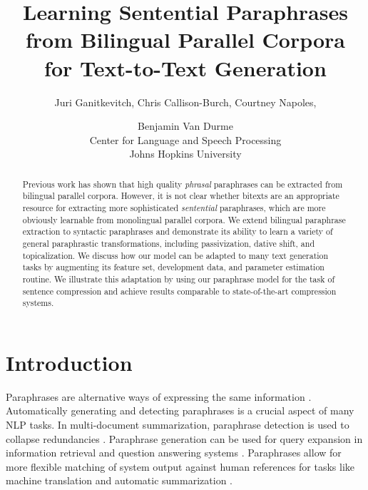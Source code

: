 \documentclass[11pt]{article}
\title{Learning Sentential Paraphrases from Bilingual Parallel Corpora
  \\ for Text-to-Text Generation}
\author{Juri Ganitkevitch, Chris Callison-Burch, Courtney
   Napoles, \and Benjamin Van Durme\\
   Center for Language and Speech Processing\\
   Johns Hopkins University}
\date{}
\begin{document}
\maketitle

\begin{abstract}
  Previous work has shown that high quality {\it phrasal} paraphrases
  can be extracted from bilingual parallel corpora.  However, it is
  not clear whether bitexts are an appropriate resource for extracting
  more sophisticated {\it sentential} paraphrases, which are more
  obviously learnable from monolingual parallel corpora.  We extend
  bilingual paraphrase extraction to syntactic paraphrases and
  demonstrate its ability to learn a variety of general paraphrastic
  transformations, including passivization, dative shift,
  and topicalization.  We discuss how our model can be adapted to
  many text generation tasks by augmenting its feature set,
  development data, and parameter estimation routine.  We illustrate
  this adaptation by using our paraphrase model for the task of
  sentence compression and achieve results comparable to
  state-of-the-art compression systems.
\end{abstract}

\section{Introduction} \label{introduction}

Paraphrases are alternative ways of expressing the same information
\cite{Culicover1968}.  Automatically generating and detecting
paraphrases is a crucial aspect of many NLP tasks.  In multi-document
summarization, paraphrase detection is used to collapse redundancies
\cite{Barzilay1999,BarzilayThesis}. Paraphrase generation can be used
for query expansion in information retrieval and question answering
systems
\cite{mckeown:1979:ACL,Anick1999,Ravichandran2002,Riezler2007}.
Paraphrases allow for more flexible matching of system output
against human references for tasks like machine translation and
automatic summarization
\cite{Zhou2006b,Kauchak2006,Madnani2007,Snover2010}.
\end{document}
